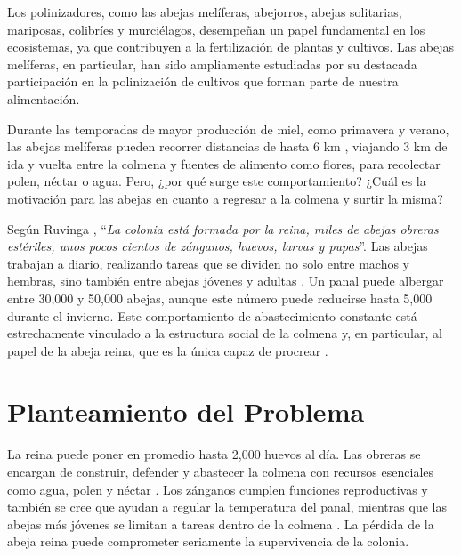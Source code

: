 \documentclass[12pt]{report}
\newenvironment{tightmulticols}{%
  \begin{multicols}{2}
  \setlength{\parskip}{0pt}
  \setlength{\parindent}{0em}
  \linespread{1}\selectfont
}{%
  \end{multicols}
}
\begin{document}
\begin{tightmulticols}
Los polinizadores, como las abejas melíferas, abejorros, abejas solitarias, mariposas, colibríes y murciélagos, desempeñan un papel fundamental en los ecosistemas, ya que contribuyen a la fertilización de plantas y cultivos. Las abejas melíferas, en particular, han sido ampliamente estudiadas por su destacada participación en la polinización de cultivos que forman parte de nuestra alimentación.

\par Durante las temporadas de mayor producción de miel, como primavera y verano, las abejas melíferas pueden recorrer distancias de hasta 6 km \cite{Beekman2000}, viajando 3 km de ida y vuelta entre la colmena y fuentes de alimento como flores, para recolectar polen, néctar o agua. Pero, ¿por qué surge este comportamiento? ¿Cuál es la motivación para las abejas en cuanto a regresar a la colmena y surtir la misma?

\par Según Ruvinga \cite{ruvinga2021use}, ``\textit{La colonia está formada por la reina, miles de abejas obreras estériles, unos pocos cientos de zánganos, huevos, larvas y pupas}''. Las abejas trabajan a diario, realizando tareas que se dividen no solo entre machos y hembras, sino también entre abejas jóvenes y adultas \cite{johnson2010division}. Un panal puede albergar entre 30,000 y 50,000 abejas, aunque este número puede reducirse hasta 5,000 durante el invierno. Este comportamiento de abastecimiento constante está estrechamente vinculado a la estructura social de la colmena y, en particular, al papel de la abeja reina, que es la única capaz de procrear \cite{ruvinga2021use}.


\section{Planteamiento del Problema}

\par La reina puede poner en promedio hasta 2,000 huevos al día. Las obreras se encargan de construir, defender y abastecer la colmena con recursos esenciales como agua, polen y néctar \cite{winston1987temperate}. Los zánganos cumplen funciones reproductivas y también se cree que ayudan a regular la temperatura del panal, mientras que las abejas más jóvenes se limitan a tareas dentro de la colmena \cite{johnson2010division}. La pérdida de la abeja reina puede comprometer seriamente la supervivencia de la colonia.


\end{tightmulticols}
\end{document}
